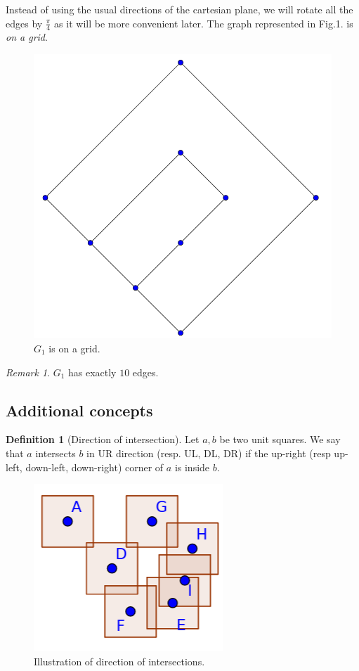 \documentclass[12pt]{article}
\theoremstyle{definition}
\newtheorem{definition}{Definition}[section]
\theoremstyle{remark}
\newtheorem*{remark}{Remark}
\begin{document}
Instead of using the usual directions of the cartesian plane, we will rotate all the edges by $\tfrac{\pi}{4}$ as it will be more convenient later.
The graph represented in Fig.1. is \textit{on a grid}.

\begin{figure}[h]
    \centering
    \includegraphics[scale=0.2]{tex_images/on_a_grid_g1.png}
    \caption{$G_1$ is on a grid.}
\end{figure}

\begin{remark}
    $G_1$ has exactly $10$ edges.
\end{remark}

\subsection{Additional concepts}

\begin{definition}[Direction of intersection]
    Let $a, b$ be two unit squares. We say that $a$ intersects $b$ in UR direction (resp. UL, DL, DR) if the up-right (resp up-left, down-left, down-right) corner
    of $a$ is inside $b$.     
\end{definition}

\begin{figure}[h]
    \centering
    \includegraphics[scale = 0.3]{tex_images/same_diagonals.png}
    \caption{Illustration of direction of intersections.}
\end{figure}
\end{document}
